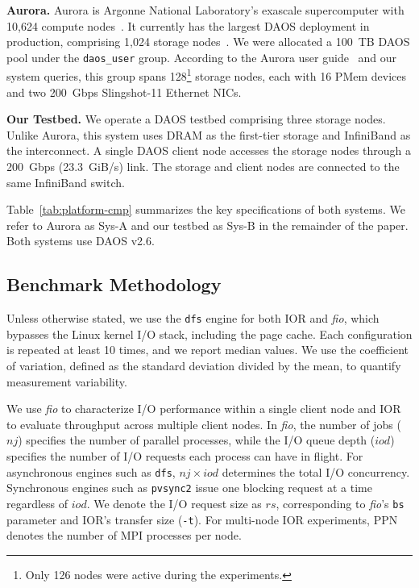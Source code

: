 \textbf{Aurora.} Aurora is Argonne National Laboratory's exascale supercomputer with 10,624 compute nodes~\cite{aurora-intro2025}. It currently has the largest DAOS deployment in production, comprising 1,024 storage nodes~\cite{aurora-daos-slingshot-rpc2025cug, io500-isc26}. We were allocated a 100~TB DAOS pool under the \texttt{daos\_user} group. According to the Aurora user guide~\cite{daos-aurora-guide} and our system queries, this group spans 128\footnote{Only 126 nodes were active during the experiments.} storage nodes, each with 16 PMem devices and two 200~Gbps Slingshot-11 Ethernet NICs.

\textbf{Our Testbed.} We operate a DAOS testbed comprising three storage nodes. Unlike Aurora, this system uses DRAM as the first-tier storage and InfiniBand as the interconnect. A single DAOS client node accesses the storage nodes through a 200~Gbps (23.3~GiB/s) link. The storage and client nodes are connected to the same InfiniBand switch.



Table~\ref{tab:platform-cmp} summarizes the key specifications of both systems. We refer to Aurora as Sys-A and our testbed as Sys-B in the remainder of the paper. Both systems use DAOS v2.6.

\subsection{Benchmark Methodology}

Unless otherwise stated, we use the \texttt{dfs} engine for both IOR and \textit{fio}, which bypasses the Linux kernel I/O stack, including the page cache. Each configuration is repeated at least 10 times, and we report median values. We use the coefficient of variation, defined as the standard deviation divided by the mean, to quantify measurement variability.

We use \textit{fio} to characterize I/O performance within a single client node and IOR to evaluate throughput across multiple client nodes. In \textit{fio}, the number of jobs ($nj$) specifies the number of parallel processes, while the I/O queue depth ($iod$) specifies the number of I/O requests each process can have in flight. For asynchronous engines such as \texttt{dfs}, $nj\times iod$ determines the total I/O concurrency. Synchronous engines such as \texttt{pvsync2} issue one blocking request at a time regardless of $iod$. We denote the I/O request size as $rs$, corresponding to \textit{fio}'s \texttt{bs} parameter and IOR's transfer size (\texttt{-t}). For multi-node IOR experiments, PPN denotes the number of MPI processes per node.

